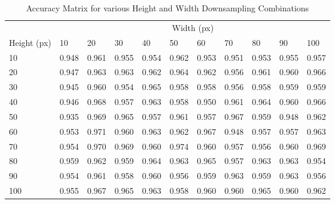 \begin{table}[H]

    \begin{tabularx}{\textwidth}{ lXXXXXXXXXX }
    \toprule
    & \multicolumn{10}{c}{Width (px)} \\
    \cmidrule{2-11}
    Height (px) & 10   & 20   & 30   & 40   & 50   & 60   & 70   & 80   & 90   & 100  \\
    \midrule
    10          & 0.948 & 0.961 & 0.955 & 0.954 & 0.962 & 0.953 & 0.951 & 0.953 & 0.955 & 0.957 \\
    20          & 0.947 & 0.963 & 0.963 & 0.962 & 0.964 & 0.962 & 0.956 & 0.961 & 0.960 & 0.966 \\
    30          & 0.945 & 0.960 & 0.954 & 0.965 & 0.958 & 0.958 & 0.956 & 0.958 & 0.959 & 0.959 \\
    40          & 0.946 & 0.968 & 0.957 & 0.963 & 0.958 & 0.950 & 0.961 & 0.964 & 0.960 & 0.966 \\
    50          & 0.935 & 0.969 & 0.965 & 0.957 & 0.961 & 0.957 & 0.967 & 0.959 & 0.948 & 0.962 \\
    60          & 0.953 & 0.971 & 0.960 & 0.963 & 0.962 & 0.967 & 0.948 & 0.957 & 0.957 & 0.963 \\
    70          & 0.954 & 0.970 & 0.969 & 0.960 & 0.974 & 0.960 & 0.957 & 0.956 & 0.960 & 0.969 \\
    80          & 0.959 & 0.962 & 0.959 & 0.964 & 0.963 & 0.965 & 0.957 & 0.963 & 0.963 & 0.954 \\
    90          & 0.954 & 0.961 & 0.958 & 0.960 & 0.956 & 0.959 & 0.963 & 0.959 & 0.963 & 0.956 \\
    100         & 0.955 & 0.967 & 0.965 & 0.963 & 0.958 & 0.960 & 0.960 & 0.965 & 0.960 & 0.962 \\
    \bottomrule
    \end{tabularx}

    \caption{Accuracy Matrix for various Height and Width Downsampling Combinations}
    \label{table:height-width-matrix}
\end{table}
